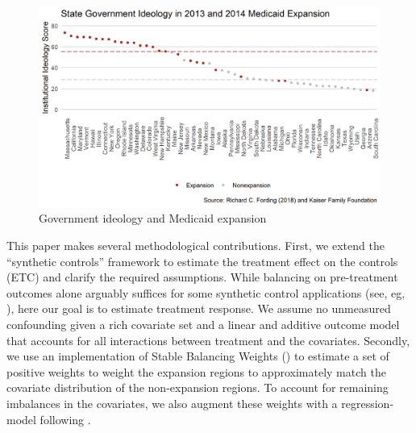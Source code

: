 \documentclass[12pt]{article}
\begin{document}
\begin{figure}
    \begin{center}
    \includegraphics[scale=0.7]{01_Plots/political-expansion-plot.png}
    \caption{Government ideology and Medicaid expansion}
    \label{fig:stateideology}
    \end{center}
\end{figure}

This paper makes several methodological contributions. First, we extend the ``synthetic controls'' framework to estimate the treatment effect on the controls (ETC) and clarify the required assumptions. While balancing on pre-treatment outcomes alone arguably suffices for some synthetic control applications (see, eg, \cite{botosaru2017role}), here our goal is to estimate treatment response. We assume no unmeasured confounding given a rich covariate set and a linear and additive outcome model that accounts for all interactions between treatment and the covariates. Secondly, we use an implementation of Stable Balancing Weights (\cite{zubizarreta2015stable}) to estimate a set of positive weights to weight the expansion regions to approximately match the covariate distribution of the non-expansion regions. To account for remaining imbalances in the covariates, we also augment these weights with a regression-model following \cite{ben2018augmented}.
\end{document}
